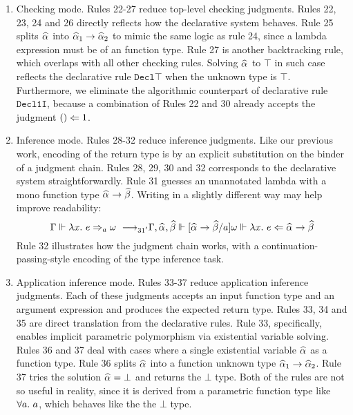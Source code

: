 \begin{enumerate}
    \item Checking mode. Rules 22-27 reduce top-level checking judgments.
            Rules 22, 23, 24 and 26 directly reflects how the declarative system behaves.
            Rule 25 splits $\al$ into $\al[1] \to \al[2]$ to mimic the same logic as rule 24,
            since a lambda expression must be of an function type.
            Rule 27 is another backtracking rule, which overlaps with all other checking rules.
            Solving $\al$ to $\top$ in such case reflects
            the declarative rule $\mathtt{Decl{\top}}$ when the unknown type is $\top$.
            Furthermore, we eliminate the algorithmic counterpart of declarative rule
            $\mathtt{Decl1I}$, because a combination of Rules 22 and 30 already
            accepts the judgment $() \Leftarrow 1$.
    
    \item Inference mode. Rules 28-32 reduce inference judgments.
            Like our previous work, encoding of the return type is by
            an explicit substitution on the binder of a judgment chain.
            Rules 28, 29, 30 and 32 corresponds to the declarative system straightforwardly.
            Rule 31 guesses an unannotated lambda with a mono function type $\al \to \bt$.
            Writing in a slightly different way may help improve readability:
            \[ \Gm \Vdash \lam e \To_a \jg \rrule{31'}
                \Gm, \al, \bt \Vdash [\al \to \bt / a]\jg \Vdash \lam e \Lto \al \to \bt \]
            Rule 32 illustrates how the judgment chain works, with a continuation-passing-style
            encoding of the type inference task.
    
    \item Application inference mode. Rules 33-37 reduce application inference judgments.
            Each of these judgments accepts an input function type and an argument expression
            and produces the expected return type.
            Rules 33, 34 and 35 are direct translation from the declarative rules.
            Rule 33, specifically, enables implicit parametric polymorphism via
            existential variable solving.
            Rules 36 and 37 deal with cases where a single existential variable
            $\al$ as a function type.
            Rule 36 splits $\al$ into a function unknown type $\al[1] \to \al[2]$.
            Rule 37 tries the solution $\al = \bot$ and returns the $\bot$ type.
            Both of the rules are not so useful in reality,
            since it is derived from a parametric function type like $\all a$,
            which behaves like the the $\bot$ type.


\end{enumerate}



